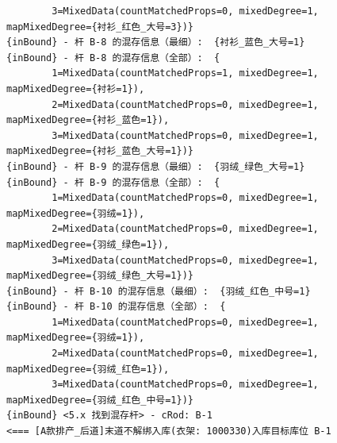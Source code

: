 {\begin{verbatim}
		3=MixedData(countMatchedProps=0, mixedDegree=1, mapMixedDegree={衬衫_红色_大号=3})}
{inBound} - 杆 B-8 的混存信息（最细）:  {衬衫_蓝色_大号=1}
{inBound} - 杆 B-8 的混存信息（全部）:  {
		1=MixedData(countMatchedProps=1, mixedDegree=1, mapMixedDegree={衬衫=1}), 
		2=MixedData(countMatchedProps=0, mixedDegree=1, mapMixedDegree={衬衫_蓝色=1}), 
		3=MixedData(countMatchedProps=0, mixedDegree=1, mapMixedDegree={衬衫_蓝色_大号=1})}
{inBound} - 杆 B-9 的混存信息（最细）:  {羽绒_绿色_大号=1}
{inBound} - 杆 B-9 的混存信息（全部）:  {
		1=MixedData(countMatchedProps=0, mixedDegree=1, mapMixedDegree={羽绒=1}), 
		2=MixedData(countMatchedProps=0, mixedDegree=1, mapMixedDegree={羽绒_绿色=1}), 
		3=MixedData(countMatchedProps=0, mixedDegree=1, mapMixedDegree={羽绒_绿色_大号=1})}
{inBound} - 杆 B-10 的混存信息（最细）:  {羽绒_红色_中号=1}
{inBound} - 杆 B-10 的混存信息（全部）:  {
		1=MixedData(countMatchedProps=0, mixedDegree=1, mapMixedDegree={羽绒=1}), 
		2=MixedData(countMatchedProps=0, mixedDegree=1, mapMixedDegree={羽绒_红色=1}), 
		3=MixedData(countMatchedProps=0, mixedDegree=1, mapMixedDegree={羽绒_红色_中号=1})}
{inBound} <5.x 找到混存杆> - cRod: B-1
<=== [A款排产_后道]末道不解绑入库(衣架: 1000330)入库目标库位 B-1


\end{verbatim}}
